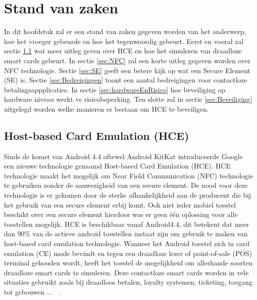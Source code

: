 \chapter{Stand van zaken}
\label{ch:stand-van-zaken}




In dit hoofdstuk zal er een stand van zaken gegeven worden van het onderwerp, hoe het vroeger gebeurde en hoe het tegenwoordig gebeurt. Eerst en vooral zal sectie \ref{sec:HCE} wat meer uitleg geven over HCE en hoe het simuleren van draadloze smart cards gebeurt. In sectie \ref{sec:NFC} zal een korte uitleg gegeven worden over NFC technologie. Sectie \ref{sec:SE} geeft een betere kijk op wat een Secure Element (SE) is. Sectie \ref{sec:Bedreigingen} toont een aantal bedreigingen voor contactloze betalingsappplicaties. In sectie \ref{sec:hardwareEnRisico} hoe beveiliging op hardware niveau werkt vs risicobeperking. Ten slotte zal in sectie \ref{sec:Beveiliging} uitgelegd worden welke manieren er bestaan om HCE te beveiligen.


\section{Host-based Card Emulation (HCE)}
\label{sec:HCE}
Sinds de komst van Android 4.4 oftewel Android KitKat introduceerde Google een nieuwe technologie genaamd Host-based Card Emulation (HCE). HCE technologie maakt het mogelijk om Near Field Communication (NFC) technologie te gebruiken zonder de aanwezigheid van een secure element. De nood voor deze technologie is er gekomen door de sterke afhankelijkheid aan de producent die bij het gebruik van een secure element erbij komt. Ook niet ieder mobiel toestel beschikt over een secure element hierdoor was er geen één oplossing voor alle toestellen mogelijk. HCE is beschikbaar vanaf Android4.4, dit betekent dat meer dan 90\% van de actieve android toestellen instaat zijn om gebruik te maken van host-based card emulation technologie. Wanneer het Android toestel zich in card emulation (CE) mode bevindt en tegen een draadloze lezer of point-of-sale (POS) terminal gehouden wordt, heeft het toestel de mogelijkheid om allerhande soorten draadloze smart cards te simuleren. Deze contactloze smart cards worden in vele situaties gebruikt zoals bij draadloos betalen, loyalty systemen, ticketing, toegang tot gebouwen ... ~\autocite{SCA2014}.

